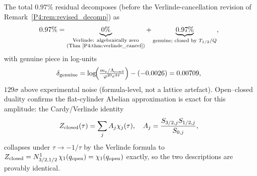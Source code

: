The total $0.97\%$ residual decomposes (before the Verlinde-cancellation
revision of Remark~\ref{P4:rem:revised_decomp}) as
\begin{equation}
  0.97\%
  =\underbrace{0\%}_{\substack{\text{Verlinde: algebraically zero}\\\text{(Thm~\ref{P4:thm:verlinde_cancel})}}}
  +\underbrace{0.97\%}_{\text{genuine; closed by }T_{1/2}/Q},
  \label{P4:eq:residual_decomp}
\end{equation}
with genuine piece in log-units
\begin{equation}
  \delta_{\mathrm{genuine}}
  = \log\!\Bigl(\tfrac{m_e/\Lambda_{\mathrm{cond}}}{\varphi^{20}e^{4\pi}}\Bigr) - (-0.0026)
  = 0.00709,
  \label{P4:eq:genuine_gap}
\end{equation}
$129\sigma$ above experimental noise (formula-level, not a lattice
artefact). Open--closed duality confirms the flat-cylinder Abelian
approximation is exact for this amplitude: the Cardy/Verlinde identity
\begin{equation}
  Z_{\rm closed}(\tau) = \sum_j A_j\chi_j(\tau),\quad
  A_j = \frac{S_{3/2,j}S_{1/2,j}}{S_{0,j}},
  \label{P4:eq:Zclosed}
\end{equation}
collapses under $\tau\to-1/\tau$ by the Verlinde formula to
$Z_{\rm closed} = N_{3/2,1/2}^1\,\chi_1(q_{\rm open}) = \chi_1(q_{\rm open})$
exactly, so the two descriptions are provably identical.

